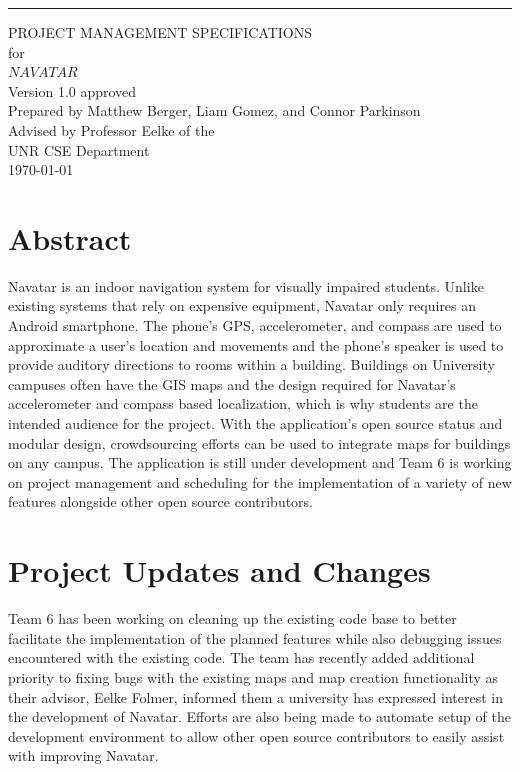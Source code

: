 \documentclass{scrreprt}
\date{}
\def\myversion{1.0 }
\begin{document}
\begin{flushright}
    \rule{16cm}{5pt}\vskip1cm
    \begin{bfseries}
        \Huge{PROJECT MANAGEMENT SPECIFICATIONS}\\
        \vspace{1.6cm}
        for\\
        \vspace{1.6cm}
        $NAVATAR$\\
        \vspace{1.6cm}
        \LARGE{Version \myversion approved}\\
        \vspace{1.6cm}
        Prepared by Matthew Berger, Liam Gomez, and Connor Parkinson\\ 
        \vspace{1.6cm}
        Advised by Professor Eelke of the\\UNR CSE Department\\
        \vspace{1.6cm}
        \today\\
    \end{bfseries}
\end{flushright}

\tableofcontents

\chapter{Abstract}
Navatar is an indoor navigation system for visually impaired students. Unlike existing systems that rely on expensive equipment, Navatar only requires an Android smartphone. The phone’s GPS, accelerometer, and compass are used to approximate a user’s location and movements and the phone’s speaker is used to provide auditory directions to rooms within a building. Buildings on University campuses often have the GIS maps and the design required for Navatar’s accelerometer and compass based localization, which is why students are the intended audience for the project. With the application’s open source status and modular design, crowdsourcing efforts can be used to integrate maps for buildings on any campus. The application is still under development and Team 6 is working on project management and scheduling for the implementation of a variety of new features alongside other open source contributors.


\chapter{Project Updates and Changes}
Team 6 has been working on cleaning up the existing code base to better facilitate the implementation of the planned features while also debugging issues encountered with the existing code. The team has recently added additional priority to fixing bugs with the existing maps and map creation functionality as their advisor, Eelke Folmer, informed them a university has expressed interest in the development of Navatar. Efforts are also being made to automate setup of the development environment to allow other open source contributors to easily assist with improving Navatar.\\
\end{document}
